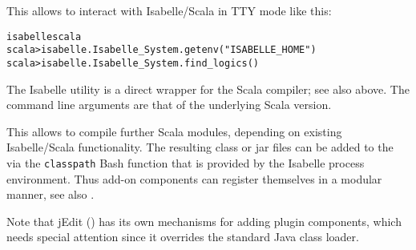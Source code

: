 \begin{isabellebody}
\begin{isamarkuptext}
  This allows to interact with Isabelle/Scala in TTY mode like this:
\begin{alltt}
  isabelle scala
  scala> isabelle.Isabelle_System.getenv("ISABELLE_HOME")
  scala> isabelle.Isabelle_System.find_logics()
\end{alltt}%
\end{isamarkuptext}%
\isamarkuptrue%
%
\isamarkuptrue%
%
\begin{isamarkuptext}%
The Isabelle \hypertarget{tool.scalac}{\hyperlink{tool.scalac}{\mbox{}}} utility is a direct wrapper
  for the Scala compiler; see also \hyperlink{tool.scala}{\mbox{}} above.  The command
  line arguments are that of the underlying Scala version.

  This allows to compile further Scala modules, depending on existing
  Isabelle/Scala functionality.  The resulting class or jar files can
  be added to the \hyperlink{setting.CLASSPATH}{\mbox{}} via the \verb|classpath|
  Bash function that is provided by the Isabelle process environment.
  Thus add-on components can register themselves in a modular manner,
  see also .

  Note that jEdit () has its own mechanisms for
  adding plugin components, which needs special attention since
  it overrides the standard Java class loader.%
\end{isamarkuptext}%
\isamarkuptrue%
%
\isadelimtheory
%
\endisadelimtheory
%
\isatagtheory
{}\isamarkupfalse%
%
\endisatagtheory
{\isafoldtheory}%
%
\isadelimtheory
%
\endisadelimtheory
\isanewline
\end{isabellebody}%
